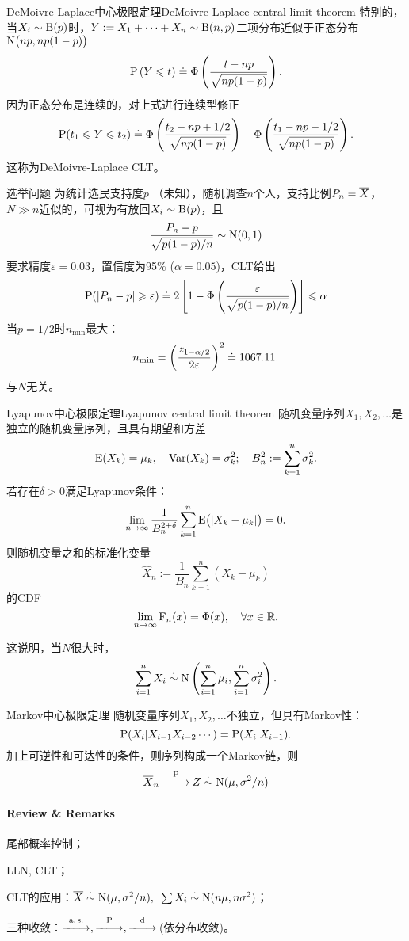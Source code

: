 \begin{example}{DeMoivre-Laplace中心极限定理}{DeMoivre-Laplace central limit theorem}
	特别的，当$X_i\sim\Bern(p)$时，$Y:=X_1+\cdots+X_n\sim\Bern(n,p)$二项分布近似于正态分布$\Norm\bigkh{np,np(1-p)}$
	\[
		\P\kh{Y\leqslant t}\doteq\Phi\kh{\frac{t-np}{\sqrt{np(1-p)}}}.
	\]
	因为正态分布是连续的，对上式进行连续型修正
	\[
		\P(t_1\leqslant Y\leqslant t_2)\doteq\Phi\kh{\frac{t_2-np+1/2}{\sqrt{np(1-p)}}}-\Phi\kh{\frac{t_1-np-1/2}{\sqrt{np(1-p)}}}.
	\]
	这称为DeMoivre-Laplace CLT。
\end{example}
\begin{example}{选举问题}{}
	为统计选民支持度$p$ （未知），随机调查$n$个人，支持比例$P_n=\avg X$，$N\gg n$近似的，可视为有放回$X_i\sim\Bern(p)$，且
	\[
		\frac{P_n-p}{\sqrt{p(1-p)/n}}\sim\Norm(0,1)
	\]
	要求精度$\varepsilon=0.03$，置信度为95\% ($\alpha=0.05$)，CLT给出
	\[
		\P(|P_n-p|\geqslant\varepsilon)\doteq 2\fkh{1-\Phi\kh{\frac\varepsilon{\sqrt{p(1-p)/n}}}}\leqslant\alpha
	\]
	当$p=1/2$时$n_{\mathrm{min}}$最大：
	\[
		n_{\mathrm{min}}=\biggkh{\frac{z_{1-\alpha/2}}{2\varepsilon}}^2\doteq 1067.11.
	\]%
	与$N$无关。
\end{example}
\begin{theorem}{Lyapunov中心极限定理}{Lyapunov central limit theorem}
	随机变量序列$X_1,X_2,\ldots$是独立的随机变量序列，且具有期望和方差
	\[
		\E(X_k)=\mu_k,\quad\Var(X_k)=\sigma_k^2;\quad B_n^2:=\sum_{k=1}^n\sigma_k^2.
	\]
	若存在$\delta>0$满足Lyapunov条件：
	\[
		\lim_{n\to\infty}\frac1{B_n^{2+\delta}}\sum_{k=1}^n\E\bigkh{|X_k-\mu_k|}=0.
	\]
	则随机变量之和的标准化变量
	\[
		\hat X_n:=\frac1{B_n}\sum_{k=1}^n(X_k-\mu_k)
	\]
	的CDF
	\[
		\lim_{n\to\infty}\CDF_n(x)=\Phi(x),\quad\forall x\in\RR.
	\]
\end{theorem}
这说明，当$N$很大时，
\begin{align}
	\sum_{i=1}^nX_i\dotsim\Norm\kh{\sum_{i=1}^n\mu_i,\sum_{i=1}^n\sigma^2_i}.
\end{align}

\begin{theorem}{Markov中心极限定理}{}
	随机变量序列$X_1,X_2,\ldots$不独立，但具有Markov性：
	\[
		\P(X_i|X_{i-1}X_{i-2}\cdots)=\P(X_i|X_{i-1}).
	\]
	加上可逆性和可达性的条件，则序列构成一个Markov链，则
	\begin{align}
		\avg X_n\pto Z\dotsim\Norm(\mu,\sigma^2/n)
	\end{align}
\end{theorem}
\paragraph{Review \& Remarks}
\begin{compactenum}
	\item 尾部概率控制；
	\item LLN, CLT；
	\item CLT的应用：$\avg X\dotsim\Norm(\mu,\sigma^2/n),\enspace\sum X_i\dotsim\Norm(n\mu,n\sigma^2)$；
	\item 三种收敛：$\asto,\pto,\dto$\,(依分布收敛)。
\end{compactenum}
\clearpage
